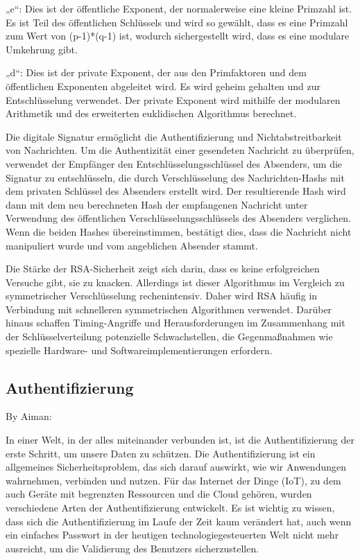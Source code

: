 „e“: Dies ist der öffentliche Exponent, der normalerweise eine kleine Primzahl ist. Es ist Teil des öffentlichen Schlüssels und wird so gewählt, dass es eine Primzahl zum Wert von (p-1)*(q-1) ist, wodurch sichergestellt wird, dass es eine modulare Umkehrung gibt.

„d“: Dies ist der private Exponent, der aus den Primfaktoren und dem öffentlichen Exponenten abgeleitet wird. Es wird geheim gehalten und zur Entschlüsselung verwendet. Der private Exponent wird mithilfe der modularen Arithmetik und des erweiterten euklidischen Algorithmus berechnet.

Die digitale Signatur ermöglicht die Authentifizierung und Nichtabstreitbarkeit von Nachrichten. Um die Authentizität einer gesendeten Nachricht zu überprüfen, verwendet der Empfänger den Entschlüsselungsschlüssel des Absenders, um die Signatur zu entschlüsseln, die durch Verschlüsselung des Nachrichten-Hashs mit dem privaten Schlüssel des Absenders erstellt wird. Der resultierende Hash wird dann mit dem neu berechneten Hash der empfangenen Nachricht unter Verwendung des öffentlichen Verschlüsselungsschlüssels des Absenders verglichen. Wenn die beiden Hashes übereinstimmen, bestätigt dies, dass die Nachricht nicht manipuliert wurde und vom angeblichen Absender stammt.

Die Stärke der RSA-Sicherheit zeigt sich darin, dass es keine erfolgreichen Versuche gibt, sie zu knacken. Allerdings ist dieser Algorithmus im Vergleich zu symmetrischer Verschlüsselung rechenintensiv. Daher wird RSA häufig in Verbindung mit schnelleren symmetrischen Algorithmen verwendet. Darüber hinaus schaffen Timing-Angriffe und Herausforderungen im Zusammenhang mit der Schlüsselverteilung potenzielle Schwachstellen, die Gegenmaßnahmen wie spezielle Hardware- und Softwareimplementierungen erfordern. \cite{milanov2009rsa}


\subsection{Authentifizierung}

By Aiman:

In einer Welt, in der alles miteinander verbunden ist, ist die Authentifizierung der erste Schritt, um unsere Daten zu schützen. Die Authentifizierung ist ein allgemeines Sicherheitsproblem, das sich darauf auswirkt, wie wir Anwendungen wahrnehmen, verbinden und nutzen. Für das Internet der Dinge (IoT), zu dem auch Geräte mit begrenzten Ressourcen und die Cloud gehören, wurden verschiedene Arten der Authentifizierung entwickelt. Es ist wichtig zu wissen, dass sich die Authentifizierung im Laufe der Zeit kaum verändert hat, auch wenn ein einfaches Passwort in der heutigen technologiegesteuerten Welt nicht mehr ausreicht, um die Validierung des Benutzers sicherzustellen.

